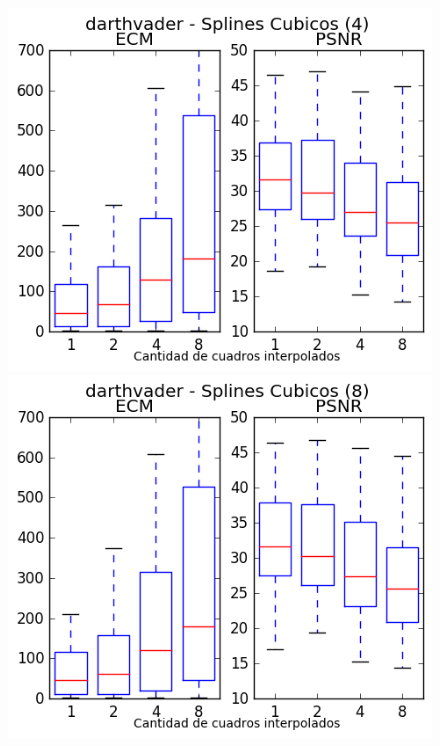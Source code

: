 \begin{figure}[H]
\centering
\begin{minipage}{0.33\textwidth}   
    \includegraphics[width=1\textwidth]{imgs/resultados_error/darthvader_2.png} 
\end{minipage}\hfill
\begin{minipage}{0.33\textwidth}   
    \includegraphics[width=1\textwidth]{imgs/resultados_error/darthvader_3.png} 
\end{minipage}\hfill

\end{figure}
